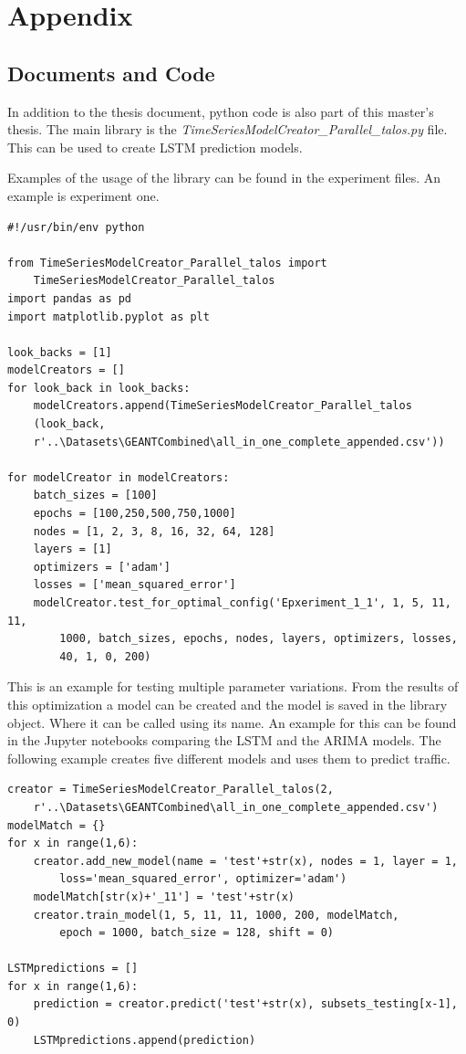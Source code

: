 \section{Appendix}

\subsection{Documents and Code}
In addition to the thesis document, python code is also part of this master's thesis.
The main library is the \textit{TimeSeriesModelCreator\_Parallel\_talos.py} file. This can be used to create LSTM prediction models.

Examples of the usage of the library can be found in the experiment files. An example is experiment one.

\begin{scriptsize}
\begin{lstlisting}
#!/usr/bin/env python

from TimeSeriesModelCreator_Parallel_talos import
	TimeSeriesModelCreator_Parallel_talos
import pandas as pd
import matplotlib.pyplot as plt

look_backs = [1]
modelCreators = []
for look_back in look_backs:
	modelCreators.append(TimeSeriesModelCreator_Parallel_talos
	(look_back,
	r'..\Datasets\GEANTCombined\all_in_one_complete_appended.csv'))

for modelCreator in modelCreators:
	batch_sizes = [100]
	epochs = [100,250,500,750,1000]
	nodes = [1, 2, 3, 8, 16, 32, 64, 128]
	layers = [1]
	optimizers = ['adam']
	losses = ['mean_squared_error']
	modelCreator.test_for_optimal_config('Epxeriment_1_1', 1, 5, 11, 11,
		1000, batch_sizes, epochs, nodes, layers, optimizers, losses,
		40,	1, 0, 200)
\end{lstlisting}
\end{scriptsize}

This is an example for testing multiple parameter variations.
From the results of this optimization a model can be created and the model is saved in the library object. Where it can be called using its name.
An example for this can be found in the Jupyter notebooks comparing the LSTM and the ARIMA models.
The following example creates five different models and uses them to predict traffic.

\begin{samepage}
\begin{scriptsize}
	\begin{lstlisting}
creator = TimeSeriesModelCreator_Parallel_talos(2,
	r'..\Datasets\GEANTCombined\all_in_one_complete_appended.csv')
modelMatch = {}
for x in range(1,6):
	creator.add_new_model(name = 'test'+str(x), nodes = 1, layer = 1, 
		loss='mean_squared_error', optimizer='adam')
	modelMatch[str(x)+'_11'] = 'test'+str(x)
	creator.train_model(1, 5, 11, 11, 1000, 200, modelMatch, 
		epoch = 1000, batch_size = 128, shift = 0)
	
LSTMpredictions = []
for x in range(1,6):
	prediction = creator.predict('test'+str(x), subsets_testing[x-1], 0)
	LSTMpredictions.append(prediction)
	\end{lstlisting}
\end{scriptsize}
\end{samepage}

